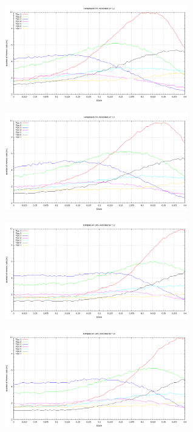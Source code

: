 \documentclass[10pt, oneside]{article} %
\begin{document}
\begin{figure}[H]
\centering
\includegraphics[width=8cm]{Figures/Porosidad_2vel_voronoi1.png}
\caption{}
\label{fg:4comp}
\end{figure}

\begin{figure}[H]
\centering
\includegraphics[width=8cm]{Figures/Porosidad_2vel_voronoi2.png}
\caption{}
\end{figure}

\begin{figure}[H]
\centering
\includegraphics[width=8cm]{Figures/Porosidad_2vel_voronoi3.png}
\caption{}
\end{figure}

\begin{figure}[H]
\centering
\includegraphics[width=8cm]{Figures/Porosidad_2vel_voronoi4.png}
\caption{}
\label{fg:7comp}
\end{figure}
\end{document}
